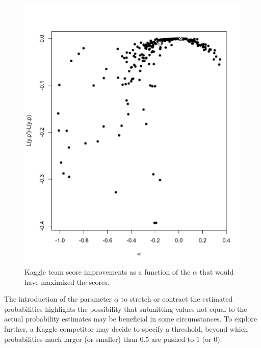 \documentclass[11pt]{article} %
\begin{document}
\begin{figure}
	\centering
	\includegraphics[width=\textwidth]{AlphaPlot.pdf}
	\caption{Kaggle team score improvements as a function of the $\alpha$ that would have maximized the scores.}
	\label{fig:alphas}
\end{figure}

The introduction of the parameter $\alpha$ to stretch or contract the estimated probabilities highlights the possibility that submitting values not equal to the actual probability estimates may be beneficial in some circumstances. To explore further, a Kaggle competitor may decide to specify a threshold, beyond which probabilities much larger (or smaller) than $0.5$ are pushed to $1$ (or $0$).
\end{document}
